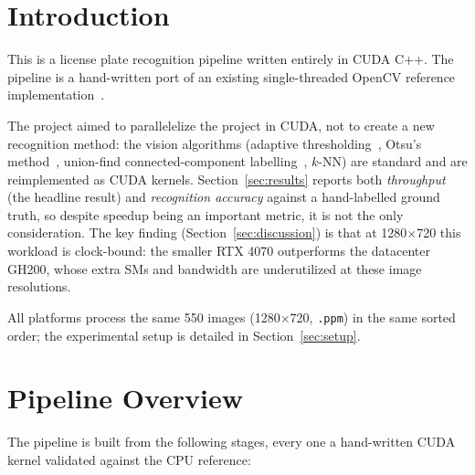 \section{Introduction}
\label{sec:intro}

This is a license plate recognition pipeline written entirely in CUDA C++.
The pipeline is a hand-written port of an existing single-threaded OpenCV reference implementation~\cite{dahms_anpr}.

The project aimed to  parallelelize the project in CUDA, not to create a new recognition method: the vision algorithms (adaptive thresholding~\cite{bradley2007,gonzalez2018}, Otsu's method~\cite{otsu1979}, union-find connected-component labelling~\cite{stava2011,komura2015}, $k$-NN) are standard and are reimplemented as CUDA kernels.
Section~\ref{sec:results} reports both \emph{throughput} (the headline result) and \emph{recognition accuracy} against a hand-labelled ground truth, so despite speedup being an important metric, it is not the only consideration.
The key finding (Section~\ref{sec:discussion}) is that at 1280$\times$720 this workload is clock-bound: the smaller RTX 4070 outperforms the datacenter GH200, whose extra SMs and bandwidth are underutilized at these image resolutions.

All platforms process the same 550 images (1280$\times$720, \texttt{.ppm}) in the same sorted order; the experimental setup is detailed in Section~\ref{sec:setup}.

\section{Pipeline Overview}
\label{sec:implemented}

The pipeline is built from the following stages, every one a hand-written CUDA kernel validated against the CPU reference:

